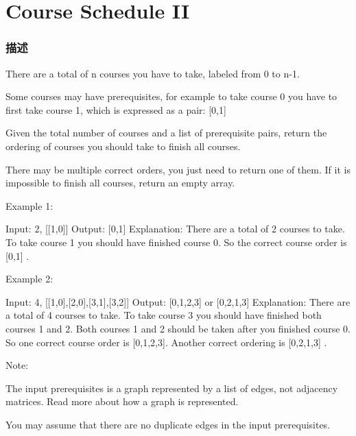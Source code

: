 \section{Course Schedule II} %
\label{sec:course-schedule-ii}


\subsubsection{描述}
There are a total of n courses you have to take, labeled from 0 to n-1.

Some courses may have prerequisites, for example to take course 0 you have to first take course 1, which is expressed as a pair: [0,1]

Given the total number of courses and a list of prerequisite pairs, return the ordering of courses you should take to finish all courses.

There may be multiple correct orders, you just need to return one of them. If it is impossible to finish all courses, return an empty array.

Example 1:
\begin{Code}
Input: 2, [[1,0]]
Output: [0,1]
Explanation: There are a total of 2 courses to take.
             To take course 1 you should have finished
             course 0. So the correct course order is [0,1] .
\end{Code}

Example 2:
\begin{Code}
Input: 4, [[1,0],[2,0],[3,1],[3,2]]
Output: [0,1,2,3] or [0,2,1,3]
Explanation: There are a total of 4 courses to take.
             To take course 3 you should have finished both courses 1 and 2.
             Both courses 1 and 2 should be taken after you finished course 0.
             So one correct course order is [0,1,2,3].
             Another correct ordering is [0,2,1,3] .
\end{Code}

Note:
\begindot
\item The input prerequisites is a graph represented by a list of edges, not adjacency matrices. Read more about how a graph is represented.
\item You may assume that there are no duplicate edges in the input prerequisites.
\myenddot

